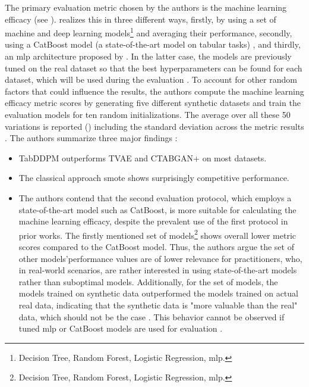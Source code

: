 The primary evaluation metric chosen by the authors is the machine learning efficacy (see ).
\textcite{kotelnikov2022TabDDPMModellingTabular} realizes this in three different ways, firstly, by using a set of machine and deep learning models\footnote[5]{Decision Tree, Random Forest, Logistic Regression, \gls{mlp}.} and averaging their performance,
secondly, using a CatBoost \cite{prokhorenkova2018CatBoostUnbiasedBoosting} \gls{model} (a state-of-the-art \gls{model} on tabular tasks) \cite{kotelnikov2022TabDDPMModellingTabular}, and thirdly, an \gls{mlp} architecture proposed by \cite{gorishniy2021RevisitingDeepLearning}.
In the latter case, the models are previously tuned on the real dataset so that the best hyperparameters can be found for each dataset, which will be used during the evaluation \cite{kotelnikov2022TabDDPMModellingTabular}.
To account for other random factors that could influence the results, the authors compute the machine learning efficacy metric scores by generating five different synthetic datasets and train the evaluation models for ten random initializations.
The average over all these 50 variations is reported (\cite[Table 3, 4, p. 8]{kotelnikov2022TabDDPMModellingTabular}) including the standard deviation across the metric results \cite{kotelnikov2022TabDDPMModellingTabular}.
\newpage
\noindent The authors summarize three major findings \cite{kotelnikov2022TabDDPMModellingTabular}:
\begin{itemize}
    \item TabDDPM outperforms TVAE and CTABGAN+ on most datasets.
    \item The classical approach \gls{smote} shows surprisingly competitive performance.
    \item The authors contend that the second evaluation protocol, which employs a state-of-the-art \gls{model} such as CatBoost, is more suitable for calculating the machine learning efficacy, 
    despite the prevalent use of the first protocol in prior works. 
    The firstly mentioned set of models\footnote[5]{Decision Tree, Random Forest, Logistic Regression, \gls{mlp}.} shows overall lower metric scores compared to the CatBoost \gls{model}.
    Thus, the authors argue the set of other models'\footnotemark[5] performance values are of lower relevance for practitioners, who, in real-world scenarios, are rather interested in using state-of-the-art models rather than suboptimal models.
    Additionally, for the set of models, the models trained on synthetic data outperformed the models trained on actual real data, indicating that the 
    synthetic data is "more valuable than the real" data, which should not be the case \cite[p. 8]{kotelnikov2022TabDDPMModellingTabular}.
    This behavior cannot be observed if tuned \gls{mlp} or CatBoost models are used for evaluation \cite{kotelnikov2022TabDDPMModellingTabular}.
\end{itemize}

